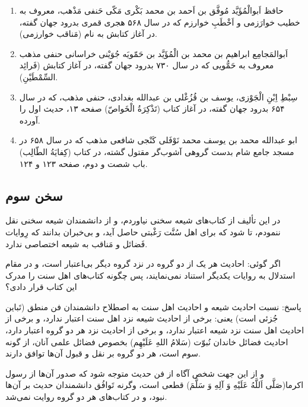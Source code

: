 \begin{enumerate}
\item

حافظ اَبوالْمُؤَیَّد مُوفَّق بن اَحمد بن محمد بَکْری مَکّی حَنفی مَذْهب، معروف به خطیب
خوارَزمی و اَخْطَبِ خوارزم که در سال ۵۶۸ هجری قمری بدرود جهان گفته، در آغاز
کتابش به نام (مَناقب خوارزمی).

\item

اَبوالمَجامِع ابراهیم بن محمد بن الْمُؤَیَّد بن حَمّویَه جُوَیْنی خراسانی حنفی مذهب
معروف به حَمُّویی که در سال ۷۳۰ بدرود جهان گفته، در آغاز کتابش (فَرائِد
السِّمْطَیْنِ).

\item

 سِبْطِ اِبْنِ‌ الْجَوْزی‌‌، یوسف‌ بن‌ قُزُغْلى‌ بن عبدالله بغدادی، حنفی مذهب، که در سال
 ۶۵۴ بدرود جهان گفته، در آغاز کتاب (تَذْکِرَةُ الْخَواصّ) صفحه ۱۳، حدیث اول را
 آورده.

\item
  
ابو عبدالله محمد بن یوسف محمد نَوْفَلی كَنْجی شافعی مذهب كه در سال ۶۵۸ در
مسجد جامع شام بدست گروهی آشوب‌گر مقتول گشته، در كتاب (كِفایَةُ الطّالِب) باب
شصت و دوم، صفحه ۱۲۳ و ۱۲۴.

\end{enumerate}
  

\subsection*{سخن سوم}

در این تألیف از کتاب‌های شیعه سخنی نیاوردم، و از دانشمندان شیعه سخنی
نقل ننمودم، تا شود که برای اهل سُنَّت رَغْبتی حاصل آید، و بی‌خبران بدانند که
رِوایات فَضائل و مَناقب به شیعه اختصاصی ندارد.

اگر گوئی: احادیث هر یک از دو گروه در نزد گروه دیگر بی‌اعتبار است، و در
مقام استدلال به روایات یکدیگر استناد نمی‌نمایند، پس چگونه کتاب‌های اهل
سنت را مدرک این کتاب قرار دادی؟

پاسخ: نسبت احادیث شیعه و احادیث اهل سنت به اصطلاح دانشمندان فن منطق
(تَباین جُزئی است) یعنی: برخی از احادیث شیعه نزد اهل سنت اعتبار ندارد، و
برخی از احادیث اهل سنت نزد شیعه اعتبار ندارد، و برخی از احادیث نزد هر
دو گروه اعتبار دارد، احادیث فضائل خاندان نُبوّت (سَلامُ اللهِ عَلَیْهِم) بخصوص
فضائل علمی آنان، از گونه سوم است، هر دو گروه بر نقل و قبول آن‌ها توافق
دارند.

و از این جهت شخص آگاه از فن حدیث متوجه شود که صدور آن‌ها از رسول
اکرما(صَلَّى اَللَّهُ عَلَيْهِ وَ آلِهِ وَ سَلَّمَ) قطعی است، وگرنه تَوافُق دانشمندان حدیث
بر آن‌ها نبود، و در کتاب‌های هر دو گروه روایت نمی‌شد.

